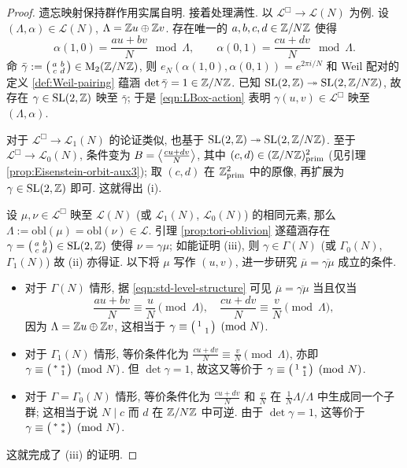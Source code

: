 \begin{proof}
	遗忘映射保持群作用实属自明. 接着处理满性. 以 $\mathcal{L}^\Box \to \mathcal{L}(N)$ 为例. 设 $(\Lambda, \alpha) \in \mathcal{L}(N)$, $\Lambda = \mathbb{Z} u \oplus \mathbb{Z} v$. 存在唯一的 $a, b, c, d \in \mathbb{Z}/N\mathbb{Z}$ 使得
	\[
		\alpha(1,0) = \dfrac{au + bv}{N} \mod \Lambda, \qquad \alpha(0,1) = \dfrac{cu + dv}{N} \mod \Lambda.
	\]
	命 $\bar{\gamma} := \bigl(\begin{smallmatrix} a & b \\ c & d \end{smallmatrix}\bigr) \in \operatorname{M}_2(\mathbb{Z}/N\mathbb{Z})$, 则 $e_N(\alpha(1,0), \alpha(0,1)) = e^{2\pi i/N}$ 和 Weil 配对的定义 \ref{def:Weil-pairing} 蕴涵 $\det\bar{\gamma} = 1 \in \mathbb{Z}/N\mathbb{Z}$. 已知 $\operatorname{SL}(2,\mathbb{Z}) \twoheadrightarrow \operatorname{SL}(2, \mathbb{Z}/N\mathbb{Z})$, 故存在 $\gamma \in \operatorname{SL}(2,\mathbb{Z})$ 映至 $\bar{\gamma}$; 于是 \eqref{eqn:LBox-action} 表明 $\gamma(u, v) \in \mathcal{L}^\Box$ 映至 $(\Lambda, \alpha)$.
	
	对于 $\mathcal{L}^\Box \to \mathcal{L}_1(N)$ 的论证类似, 也基于 $\operatorname{SL}(2,\mathbb{Z}) \twoheadrightarrow \operatorname{SL}(2, \mathbb{Z}/N\mathbb{Z})$. 至于 $\mathcal{L}^\Box \to \mathcal{L}_0(N)$, 条件变为 $B = \left\langle \frac{cu + dv}{N} \right\rangle$, 其中 $(c,d) \in (\mathbb{Z}/N\mathbb{Z})^2_{\mathrm{prim}}$ (见引理 \ref{prop:Eisenstein-orbit-aux3}); 取 $(c,d)$ 在 $\mathbb{Z}^2_{\mathrm{prim}}$ 中的原像, 再扩展为 $\gamma \in \operatorname{SL}(2,\mathbb{Z})$ 即可. 这就得出 (i).

	设 $\mu, \nu \in \mathcal{L}^\Box$ 映至 $\mathcal{L}(N)$ (或 $\mathcal{L}_1(N)$, $\mathcal{L}_0(N)$) 的相同元素, 那么 $\Lambda := \mathrm{obl}(\mu) = \mathrm{obl}(\nu) \in \mathcal{L}$. 引理 \ref{prop:tori-oblivion} 遂蕴涵存在 $\gamma = \bigl(\begin{smallmatrix} a & b \\ c & d \end{smallmatrix}\bigr) \in \operatorname{SL}(2,\mathbb{Z})$ 使得 $\nu = \gamma\mu$; 如能证明 (iii), 则 $\gamma \in \Gamma(N)$ (或 $\Gamma_0(N)$, $\Gamma_1(N)$) 故 (ii) 亦得证. 以下将 $\mu$ 写作 $(u,v)$, 进一步研究 $\overline{\mu} = \overline{\gamma\mu}$ 成立的条件.
	\begin{itemize}
		\item 对于 $\Gamma(N)$ 情形, 据 \eqref{eqn:std-level-structure} 可见 $\overline{\mu} = \overline{\gamma\mu}$ 当且仅当
		\[ \frac{au + bv}{N} \equiv \frac{u}{N} \pmod{\Lambda}, \quad \frac{cu + dv}{N} \equiv \frac{v}{N} \pmod{\Lambda}, \]
		因为 $\Lambda = \mathbb{Z} u \oplus \mathbb{Z} v$, 这相当于 $\gamma \equiv \bigl(\begin{smallmatrix} 1 &  \\  & 1 \end{smallmatrix}\bigr) \pmod{N}$.
		\item 对于 $\Gamma_1(N)$ 情形, 等价条件化为 $\frac{cu + dv}{N} \equiv \frac{v}{N} \pmod{\Lambda}$, 亦即 $\gamma \equiv \bigl(\begin{smallmatrix} * & * \\  & 1 \end{smallmatrix}\bigr) \pmod{N}$. 但 $\det \gamma = 1$, 故这又等价于 $\gamma \equiv \bigl(\begin{smallmatrix} 1 & * \\  & 1 \end{smallmatrix}\bigr) \pmod{N}$.
		\item 对于 $\Gamma = \Gamma_0(N)$ 情形, 等价条件化为 $\frac{cu + dv}{N}$ 和 $\frac{v}{N}$ 在 $\frac{1}{N} \Lambda / \Lambda$ 中生成同一个子群; 这相当于说 $N \mid c$ 而 $d$ 在 $\mathbb{Z}/N\mathbb{Z}$ 中可逆. 由于 $\det \gamma = 1$, 这等价于 $\gamma \equiv \bigl(\begin{smallmatrix} * & * \\  & * \end{smallmatrix}\bigr) \pmod{N}$.
	\end{itemize}
	这就完成了 (iii) 的证明.
\end{proof}

